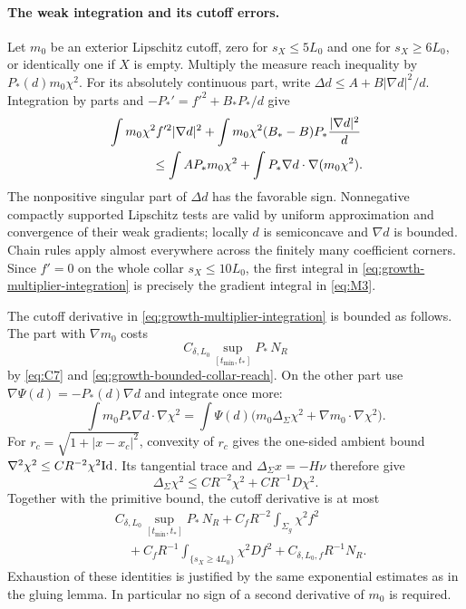 \paragraph{The weak integration and its cutoff errors.}
Let $m_0$ be an exterior Lipschitz cutoff, zero for $s_X\le5L_0$ and
one for $s_X\ge6L_0$, or identically one if $X$ is empty.  Multiply the
measure reach inequality by $P_*(d)m_0\chi^2$.  For its absolutely
continuous part, write $\Delta d\le A+B|\nabla d|^2/d$.  Integration
by parts and $-P_*'=f'^2+B_*P_*/d$ give
\begin{equation}\label{eq:growth-multiplier-integration}
 \begin{split}
 &\int m_0\chi^2 f'^2|\nabla d|^2
 +\int m_0\chi^2(B_*-B)P_*\frac{|\nabla d|^2}{d}\\
 &\hspace{12mm}\le\int AP_*m_0\chi^2
       +\int P_*\nabla d\cdot\nabla(m_0\chi^2).
 \end{split}
\end{equation}
The nonpositive singular part of $\Delta d$ has the favorable sign.
Nonnegative compactly supported Lipschitz tests are valid by uniform
approximation and convergence of their weak gradients; locally $d$ is
semiconcave and $\nabla d$ is bounded.  Chain rules apply almost
everywhere across the finitely many coefficient corners.  Since
$f'=0$ on the whole collar $s_X\le10L_0$, the first integral in
\eqref{eq:growth-multiplier-integration} is precisely the gradient
integral in \eqref{eq:M3}.

The cutoff derivative in \eqref{eq:growth-multiplier-integration} is
bounded as follows.  The part with $\nabla m_0$ costs
\[
 C_{\delta,L_0}\sup_{[t_{\min},t_*]}P_*\,N_R
\]
by
\eqref{eq:C7} and \eqref{eq:growth-bounded-collar-reach}.  On the other
part use $\nabla\Psi(d)=-P_*(d)\nabla d$ and integrate once more:
\[
 \int m_0P_*\nabla d\cdot\nabla\chi^2
 =\int\Psi(d)\bigl(m_0\Delta_\Sigma\chi^2
                      +\nabla m_0\cdot\nabla\chi^2\bigr).
\]
For $r_c=\sqrt{1+|x-x_c|^2}$, convexity of $r_c$ gives the one-sided
ambient bound $\nabla^2\chi^2\le CR^{-2}\chi^2\mathrm{Id}$.  Its tangential
trace and $\Delta_\Sigma x=-H\nu$ therefore give
\[
 \Delta_\Sigma\chi^2\le CR^{-2}\chi^2+CR^{-1}D\chi^2.
\]
Together with the primitive bound, the cutoff derivative is at most
\begin{equation}\label{eq:growth-spatial-error}
 \begin{split}
 &C_{\delta,L_0}\sup_{[t_{\min},t_*]}P_*\,N_R
 +C_fR^{-2}\int_{\Sigma_g}\chi^2f^2\\
 &\quad+C_fR^{-1}\int_{\{s_X\ge4L_0\}}\chi^2Df^2
 +C_{\delta,L_0,f}R^{-1}N_R.
 \end{split}
\end{equation}
Exhaustion of these identities is justified by the same exponential
estimates as in the gluing lemma.  In particular no sign of a second
derivative of $m_0$ is required.

